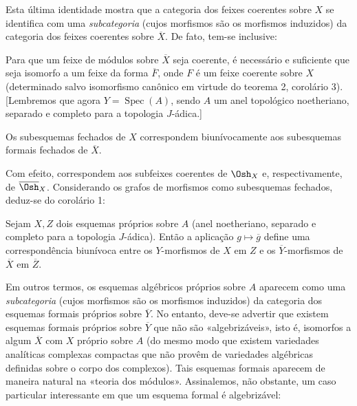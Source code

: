Esta última identidade mostra que a categoria dos feixes coerentes sobre
$X$ se identifica com uma \emph{subcategoria} (cujos morfismos são os
morfismos induzidos) da categoria dos feixes coerentes sobre
$\overline X$. De fato, tem-se inclusive:

 Para que um feixe de módulos sobre $\overline X$ seja
coerente, é necessário e suficiente que seja isomorfo a um feixe da forma
$\overline F$, onde $F$ é um feixe coerente sobre $X$ (determinado salvo
isomorfismo canônico em virtude do teorema 2, corolário 3). [Lembremos que
agora $Y=\operatorname{Spec}(A)$, sendo $A$ um anel topológico noetheriano,
separado e completo para a topologia $J$-ádica.]

 Os subesquemas fechados de $X$ correspondem
biunívocamente aos subesquemas formais fechados de $\overline X$.

Com efeito, correspondem aos subfeixes coerentes de $\Osh_X$ e,
respectivamente, de $\overline{\Osh}_X$. Considerando os grafos de morfismos
como subesquemas fechados, deduz-se do corolário 1:

 Sejam $X,Z$ dois esquemas próprios sobre $A$ (anel
noetheriano, separado e completo para a topologia $J$-ádica). Então a
aplicação $g\longmapsto\overline g$ define uma correspondência biunívoca entre
os $Y$-morfismos de $X$ em $Z$ e os $\overline Y$-morfismos de $\overline X$
em $\overline Z$.

Em outros termos, os esquemas algébricos próprios sobre $A$ aparecem como uma
\emph{subcategoria} (cujos morfismos são os morfismos induzidos) da
categoria dos esquemas formais próprios sobre $\overline Y$. No entanto,
deve-se advertir que existem esquemas formais próprios sobre $\overline Y$ que
não são «algebrizáveis», isto é, isomorfos a algum $\overline X$ com $X$
próprio sobre $A$ (do mesmo modo que existem variedades analíticas complexas
compactas que não provêm de variedades algébricas definidas sobre o corpo
dos complexos). Tais esquemas formais aparecem de maneira natural na
«teoria dos módulos». Assinalemos, não obstante, um caso particular interessante em
que um esquema formal é algebrizável:

